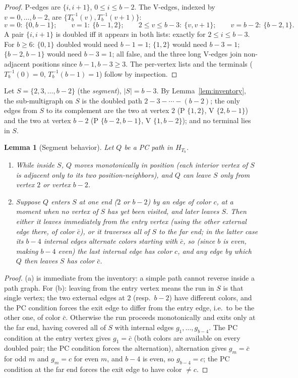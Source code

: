 \documentclass[11pt]{article}
\newtheorem{lemma}[theorem]{Lemma}
\theoremstyle{definition}
\newcommand{\inv}[1]{#1^{-1}}
\begin{document}
\begin{proof}
P-edges are $\{i, i+1\}$, $0 \le i \le b-2$. The V-edges, indexed by $v = 0, \dots,
b-2$, are $\{\inv{T_b}(v), \inv{T_b}(v+1)\}$:
\[
v = 0:\ \{0, b{-}1\}; \qquad
v = 1:\ \{b{-}1, 2\}; \qquad
2 \le v \le b-3:\ \{v, v{+}1\}; \qquad
v = b{-}2:\ \{b{-}2, 1\}.
\]
A pair $\{i, i+1\}$ is doubled iff it appears in both lists: exactly for
$2 \le i \le b-3$. For $b \ge 6$: $\{0,1\}$ doubled would need $b-1=1$;
$\{1,2\}$ would need $b-3=1$; $\{b-2,b-1\}$ would need $b-3=1$; all false, and the
three long V-edges join non-adjacent positions since $b-1,b-3\ge3$. The per-vertex
lists and the terminals ($\inv{T_b}(0)=0$, $\inv{T_b}(b-1)=1$) follow by inspection.
\end{proof}

Let $S = \{2, 3, \dots, b-2\}$ (the \emph{segment}), $|S| = b - 3$. By
Lemma~\ref{lem:inventory}, the sub-multigraph on $S$ is the doubled path
$2 - 3 - \cdots - (b-2)$; the only edges from $S$ to its complement are the two at
vertex $2$ (P $\{1,2\}$, V $\{2,b-1\}$) and the two at vertex $b-2$ (P $\{b-2,b-1\}$,
V $\{1,b-2\}$); and no terminal lies in $S$.

\begin{lemma}[Segment behavior]\label{lem:segment}
Let $Q$ be a PC path in $H_{T_b}$.
\begin{enumerate}
\item[(a)] While inside $S$, $Q$ moves monotonically in position (each interior vertex
of $S$ is adjacent only to its two position-neighbors), and $Q$ can leave $S$ only from
vertex $2$ or vertex $b-2$.
\item[(b)] Suppose $Q$ enters $S$ at one end ($2$ or $b-2$) by an edge of color $c$, at
a moment when no vertex of $S$ has yet been visited, and later leaves $S$. Then either
it leaves immediately from the entry vertex (using the other external edge there, of
color $\bar c$), or it traverses all of $S$ to the far end; in the latter case its
$b-4$ internal edges alternate colors starting with $\bar c$, so (since $b$ is even,
making $b - 4$ even) the last internal edge has color $c$, and any edge by which $Q$
then leaves $S$ has color $\bar c$.
\end{enumerate}
\end{lemma}

\begin{proof}
(a) is immediate from the inventory: a simple path cannot reverse inside a path graph.
For (b): leaving from the entry vertex means the run in $S$ is that single vertex; the
two external edges at $2$ (resp.\ $b-2$) have different colors, and the PC condition
forces the exit edge to differ from the entry edge, i.e.\ to be the other one, of color
$\bar c$. Otherwise the run proceeds monotonically and exits only at the far end,
having covered all of $S$ with internal edges $g_1,\dots,g_{b-4}$. The PC condition at
the entry vertex gives $g_1 = \bar c$ (both colors are available on every doubled pair;
the PC condition forces the alternation), alternation gives $g_m=\bar c$ for odd $m$
and $g_m=c$ for even $m$, and $b-4$ is even, so $g_{b-4}=c$; the PC condition at the far
end forces the exit edge to have color $\ne c$.
\end{proof}
\end{document}
